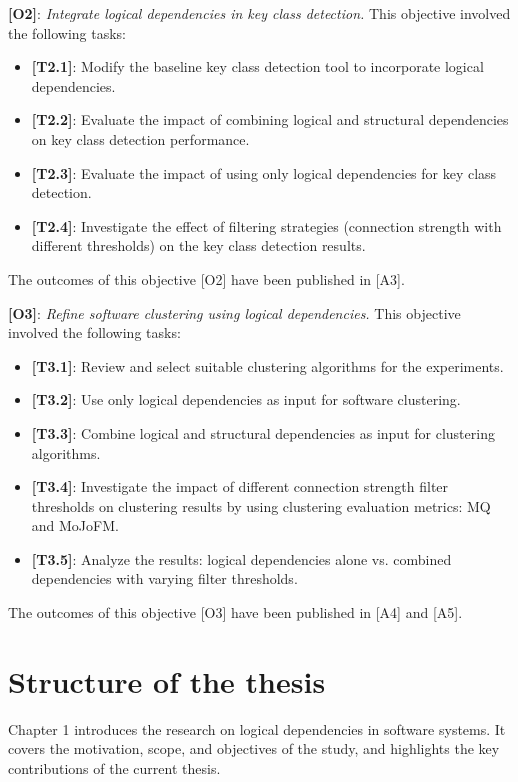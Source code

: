\textbf{[O2]}: \textit{Integrate logical dependencies in key class detection.}
This objective involved the following tasks:
\begin{itemize}
\item \textbf{[T2.1]}: Modify the baseline key class detection tool to incorporate logical dependencies.
\item \textbf{[T2.2]}: Evaluate the impact of combining logical and structural dependencies on key class detection performance.
\item \textbf{[T2.3]}: Evaluate the impact of using only logical dependencies for key class detection.
\item \textbf{[T2.4]}: Investigate the effect of filtering strategies (connection strength with different thresholds) on the key class detection results.
\end{itemize}
The outcomes of this objective [O2] have been published in [A3].

\textbf{[O3]}: \textit{Refine software clustering using logical dependencies.}
This objective involved the following tasks:
\begin{itemize}
\item \textbf{[T3.1]}: Review and select suitable clustering algorithms for the experiments.
\item \textbf{[T3.2]}: Use only logical dependencies as input for software clustering.
\item \textbf{[T3.3]}: Combine logical and structural dependencies as input for clustering algorithms.
\item \textbf{[T3.4]}: Investigate the impact of different connection strength filter thresholds on clustering results by using clustering evaluation metrics: MQ and MoJoFM.
\item \textbf{[T3.5]}: Analyze the results: logical dependencies alone vs. combined dependencies with varying filter thresholds.
\end{itemize}
The outcomes of this objective [O3] have been published in [A4] and [A5].

\section{Structure of the thesis}
\hspace{4em}Chapter 1 introduces the research on logical dependencies in software systems. It covers the motivation, scope, and objectives of the study, and highlights the key contributions of the current thesis.

